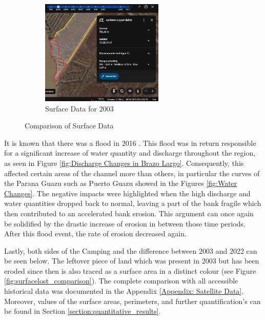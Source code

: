 \begin{figure}[H]
    \hfill
    \begin{subfigure}[b]{0.45\textwidth} %
        \includegraphics[width=\linewidth, height=5cm]{figures/appendix-g/verlorenopp2003.png}
        \caption{Surface Data for 2003}
        \label{fig:surface2003.2}
    \end{subfigure}
    \caption{Comparison of Surface Data}
    \label{fig:surface_comparison}
\end{figure}

It is known that there was a flood in 2016 \autocite{equipodemanejodeinformacionArgentinaInundaciones2016}. This flood was in return responsible for a significant increase of water quantity and discharge throughout the region, as seen in Figure \ref{fig:Discharge Changes in Brazo Largo}. Consequently, this affected certain areas of the channel more than others, in particular the curves of the Parana Guazu such as Puerto Guazu showed in the Figures \ref{fig:Water Changes}. The negative impacts were highlighted when the high discharge and water quantities dropped back to normal, leaving a part of the bank fragile which then contributed to an accelerated bank erosion. This argument can once again be solidified by the drastic increase of erosion in between those time periods. After this flood event, the rate of erosion decreased again.

Lastly, both sides of the Camping and the difference between 2003 and 2022 can be seen below. The leftover piece of land which was present in 2003 but has been eroded since then is also traced as a surface area in a distinct colour (see Figure \ref{fig:surfacelost_comparison}). The complete comparison with all accessible historical data was documented in the Appendix \ref{Appendix: Satellite Data}. Moreover, values of the surface areas, perimeters, and further quantification's can be found in Section \ref{section:quantitative_results}.

